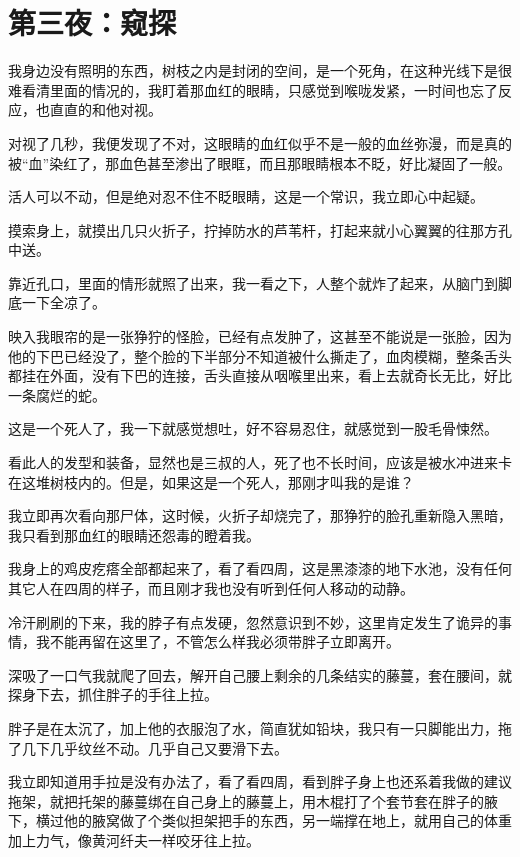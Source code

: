 \chapter{第三夜：窥探}

我身边没有照明的东西，树枝之内是封闭的空间，是一个死角，在这种光线下是很难看清里面的情况的，我盯着那血红的眼睛，只感觉到喉咙发紧，一时间也忘了反应，也直直的和他对视。

对视了几秒，我便发现了不对，这眼睛的血红似乎不是一般的血丝弥漫，而是真的被“血”染红了，那血色甚至渗出了眼眶，而且那眼睛根本不眨，好比凝固了一般。

活人可以不动，但是绝对忍不住不眨眼睛，这是一个常识，我立即心中起疑。

摸索身上，就摸出几只火折子，拧掉防水的芦苇杆，打起来就小心翼翼的往那方孔中送。

靠近孔口，里面的情形就照了出来，我一看之下，人整个就炸了起来，从脑门到脚底一下全凉了。

映入我眼帘的是一张狰狞的怪脸，已经有点发肿了，这甚至不能说是一张脸，因为他的下巴已经没了，整个脸的下半部分不知道被什么撕走了，血肉模糊，整条舌头都挂在外面，没有下巴的连接，舌头直接从咽喉里出来，看上去就奇长无比，好比一条腐烂的蛇。

这是一个死人了，我一下就感觉想吐，好不容易忍住，就感觉到一股毛骨悚然。

看此人的发型和装备，显然也是三叔的人，死了也不长时间，应该是被水冲进来卡在这堆树枝内的。但是，如果这是一个死人，那刚才叫我的是谁？

我立即再次看向那尸体，这时候，火折子却烧完了，那狰狞的脸孔重新隐入黑暗，我只看到那血红的眼睛还怨毒的瞪着我。

我身上的鸡皮疙瘩全部都起来了，看了看四周，这是黑漆漆的地下水池，没有任何其它人在四周的样子，而且刚才我也没有听到任何人移动的动静。

冷汗刷刷的下来，我的脖子有点发硬，忽然意识到不妙，这里肯定发生了诡异的事情，我不能再留在这里了，不管怎么样我必须带胖子立即离开。

深吸了一口气我就爬了回去，解开自己腰上剩余的几条结实的藤蔓，套在腰间，就探身下去，抓住胖子的手往上拉。

胖子是在太沉了，加上他的衣服泡了水，简直犹如铅块，我只有一只脚能出力，拖了几下几乎纹丝不动。几乎自己又要滑下去。

我立即知道用手拉是没有办法了，看了看四周，看到胖子身上也还系着我做的建议拖架，就把托架的藤蔓绑在自己身上的藤蔓上，用木棍打了个套节套在胖子的腋下，横过他的腋窝做了个类似担架把手的东西，另一端撑在地上，就用自己的体重加上力气，像黄河纤夫一样咬牙往上拉。

